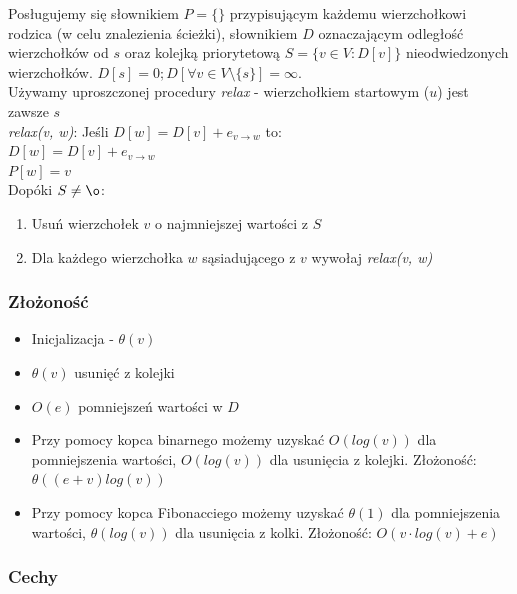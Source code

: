 \documentclass[12pt]{article}
\begin{document}
    Posługujemy się słownikiem $P = \{\}$ przypisującym każdemu wierzchołkowi
    rodzica (w celu znalezienia ścieżki), słownikiem $D$ oznaczającym odległość
    wierzchołków od $s$ oraz kolejką priorytetową $S = \{v \in V : D[v]\}$ nieodwiedzonych
    wierzchołków. $D[s] = 0; D[\forall v \in V \setminus \{s\}] = \infty$.
    \[\]
    Używamy uproszczonej procedury \textit{relax} - wierzchołkiem startowym ($u$) jest zawsze $s$
    \[\]
    \textit{relax(v, w)}:
    \vskip 0pt Jeśli $D[w] = D[v] + e_{v \rightarrow w}$ to:\\
    \hspace*{1cm} $D[w] = D[v] + e_{v \rightarrow w}$ \\
    \hspace*{1cm} $P[w] = v$ \\

    \[\]
    Dopóki $S \neq \o$:
    \begin{enumerate}
        \item Usuń wierzchołek $v$ o najmniejszej wartości z $S$
        \item Dla każdego wierzchołka $w$ sąsiadującego z $v$ wywołaj \textit{relax(v, w)}
    \end{enumerate}

    \subsubsection{Złożoność}

    \begin{itemize}
        \item Inicjalizacja - $\theta(v)$
        \item $\theta(v)$ usunięć z kolejki
        \item $O(e)$ pomniejszeń wartości w $D$
        \item Przy pomocy kopca binarnego możemy uzyskać $O(log(v))$ dla pomniejszenia
        wartości, $O(log(v))$ dla usunięcia z kolejki. Złożoność:
        $\theta((e + v)log(v))$

        \item Przy pomocy kopca Fibonacciego możemy uzyskać $\theta(1)$ dla pomniejszenia
        wartości, $\theta(log (v))$ dla usunięcia z kolki. Złożoność:
        $O(v \cdot log(v) + e)$
    \end{itemize}

    \subsubsection{Cechy}
\end{document}
